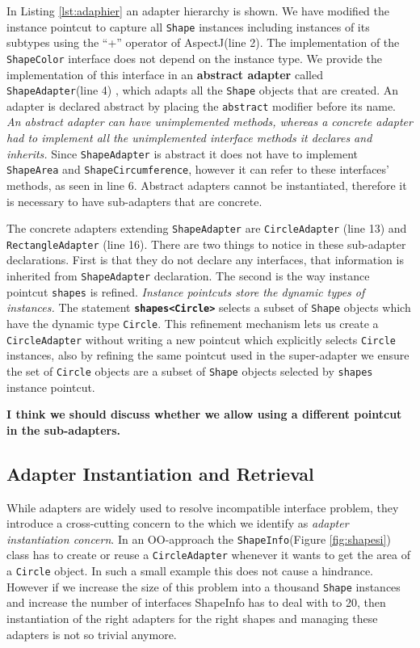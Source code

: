\documentclass{llncs}
\begin{document}
In Listing \ref{lst:adaphier} an adapter hierarchy is shown. We have modified the instance pointcut to capture all \texttt{Shape} instances including instances of its subtypes using the ``+'' operator of AspectJ(line 2). The implementation of the \texttt{ShapeColor} interface does not depend on the instance type. We provide the implementation of this interface in an \textbf{abstract adapter} called \texttt{ShapeAdapter}(line 4) , which adapts all the \texttt{Shape} objects that are created. An adapter is declared abstract by placing the \texttt{abstract} modifier before its name. \emph{An abstract adapter can have unimplemented methods, whereas a concrete adapter had to implement all the unimplemented interface methods it declares and inherits.} Since \texttt{ShapeAdapter} is abstract it does not have to implement \texttt{ShapeArea} and \texttt{ShapeCircumference}, however it can refer to these interfaces' methods, as seen in line 6.  Abstract adapters cannot be instantiated, therefore it is necessary to have sub-adapters that are concrete.

The concrete adapters extending \texttt{ShapeAdapter} are \texttt{CircleAdapter} (line 13) and \texttt{RectangleAdapter} (line 16). There are two things to notice in these sub-adapter declarations. First is that they do not declare any interfaces, that information is inherited from \texttt{ShapeAdapter} declaration. The second is the way instance pointcut \texttt{shapes} is refined. \emph{Instance pointcuts store the dynamic types of instances.} The statement \texttt{\textbf{shapes<Circle>}} selects a subset of \texttt{Shape} objects which have the dynamic type \texttt{Circle}. This refinement mechanism lets us create a \texttt{CircleAdapter} without writing a new pointcut which explicitly selects \texttt{Circle} instances, also by refining the same pointcut used in the super-adapter we ensure the set of \texttt{Circle} objects are a subset of \texttt{Shape} objects selected by \texttt{shapes} instance pointcut.

\textbf{\textcolor[rgb]{1,0,0}{I think we should discuss whether we allow using a different pointcut in the sub-adapters.}}

\subsection{Adapter Instantiation and Retrieval}
While adapters are widely used to resolve incompatible interface problem, they introduce a cross-cutting concern to the which we identify as \emph{adapter instantiation concern}. In an OO-approach  the \texttt{ShapeInfo}(Figure \ref{fig:shapesi}) class has to create or reuse a \texttt{CircleAdapter} whenever it wants to get the area of a \texttt{Circle} object. In such a small example this does not cause a hindrance. However if we increase the size of this problem into a thousand \texttt{Shape} instances and increase the number of interfaces ShapeInfo has to deal with to 20, then instantiation of the right adapters for the right shapes and managing these adapters is not so trivial anymore. 
\end{document}
